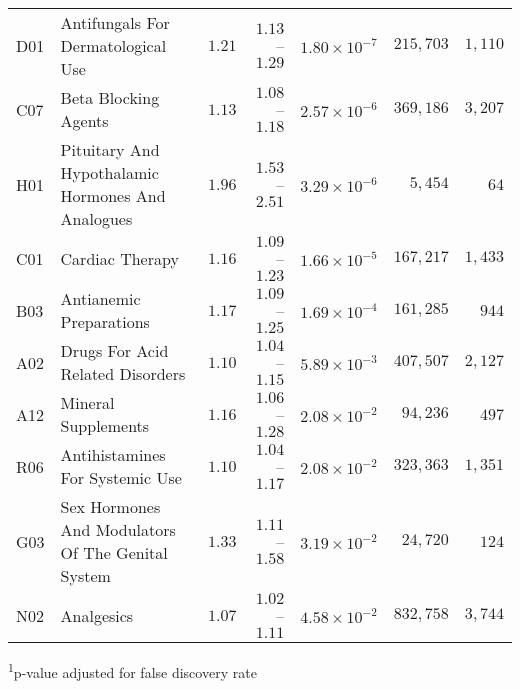 \begin{longtable}{llrrrrr}
D01 & Antifungals For Dermatological Use & $1.21$ & $1.13$–$1.29$ & $1.80 \times 10^{-7}$ & $215,703$ & $1,110$ \\ 
C07 & Beta Blocking Agents & $1.13$ & $1.08$–$1.18$ & $2.57 \times 10^{-6}$ & $369,186$ & $3,207$ \\ 
H01 & Pituitary And Hypothalamic Hormones And Analogues & $1.96$ & $1.53$–$2.51$ & $3.29 \times 10^{-6}$ & $5,454$ & $64$ \\ 
C01 & Cardiac Therapy & $1.16$ & $1.09$–$1.23$ & $1.66 \times 10^{-5}$ & $167,217$ & $1,433$ \\ 
B03 & Antianemic Preparations & $1.17$ & $1.09$–$1.25$ & $1.69 \times 10^{-4}$ & $161,285$ & $944$ \\ 
A02 & Drugs For Acid Related Disorders & $1.10$ & $1.04$–$1.15$ & $5.89 \times 10^{-3}$ & $407,507$ & $2,127$ \\ 
A12 & Mineral Supplements & $1.16$ & $1.06$–$1.28$ & $2.08 \times 10^{-2}$ & $94,236$ & $497$ \\ 
R06 & Antihistamines For Systemic Use & $1.10$ & $1.04$–$1.17$ & $2.08 \times 10^{-2}$ & $323,363$ & $1,351$ \\ 
G03 & Sex Hormones And Modulators Of The Genital System & $1.33$ & $1.11$–$1.58$ & $3.19 \times 10^{-2}$ & $24,720$ & $124$ \\ 
N02 & Analgesics & $1.07$ & $1.02$–$1.11$ & $4.58 \times 10^{-2}$ & $832,758$ & $3,744$ \\ 
\bottomrule
\end{longtable}
\begin{minipage}{\linewidth}
\textsuperscript{1}p-value adjusted for false discovery rate\\
\end{minipage}

